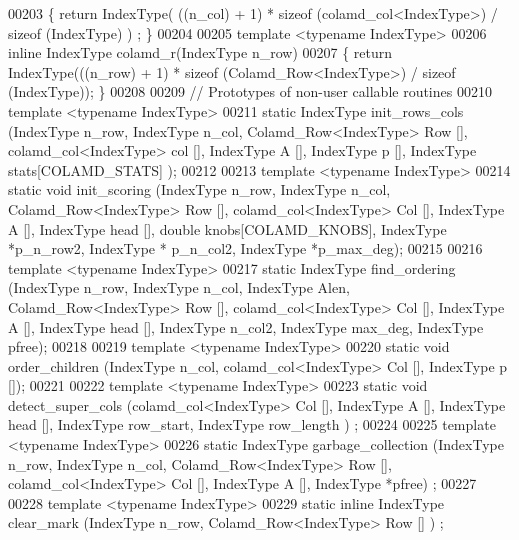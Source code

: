 \begin{DoxyCode}
00203 \{ \textcolor{keywordflow}{return} IndexType( ((n\_col) + 1) * \textcolor{keyword}{sizeof} (colamd\_col<IndexType>) / \textcolor{keyword}{sizeof} (IndexType) ) ; \}
00204 
00205 \textcolor{keyword}{template} <\textcolor{keyword}{typename} IndexType>
00206 \textcolor{keyword}{inline} IndexType  colamd\_r(IndexType n\_row)
00207 \{ \textcolor{keywordflow}{return} IndexType(((n\_row) + 1) * \textcolor{keyword}{sizeof} (Colamd\_Row<IndexType>) / \textcolor{keyword}{sizeof} (IndexType)); \}
00208 
00209 \textcolor{comment}{// Prototypes of non-user callable routines}
00210 \textcolor{keyword}{template} <\textcolor{keyword}{typename} IndexType>
00211 \textcolor{keyword}{static} IndexType init\_rows\_cols (IndexType n\_row, IndexType n\_col, Colamd\_Row<IndexType> Row [], 
      colamd\_col<IndexType> col [], IndexType A [], IndexType p [], IndexType stats[COLAMD\_STATS] ); 
00212 
00213 \textcolor{keyword}{template} <\textcolor{keyword}{typename} IndexType>
00214 \textcolor{keyword}{static} \textcolor{keywordtype}{void} init\_scoring (IndexType n\_row, IndexType n\_col, Colamd\_Row<IndexType> Row [], 
      colamd\_col<IndexType> Col [], IndexType A [], IndexType head [], \textcolor{keywordtype}{double} knobs[COLAMD\_KNOBS], IndexType *p\_n\_row2, IndexType *
      p\_n\_col2, IndexType *p\_max\_deg);
00215 
00216 \textcolor{keyword}{template} <\textcolor{keyword}{typename} IndexType>
00217 \textcolor{keyword}{static} IndexType find\_ordering (IndexType n\_row, IndexType n\_col, IndexType Alen, Colamd\_Row<IndexType> Row
       [], colamd\_col<IndexType> Col [], IndexType A [], IndexType head [], IndexType n\_col2, IndexType max\_deg, 
      IndexType pfree);
00218 
00219 \textcolor{keyword}{template} <\textcolor{keyword}{typename} IndexType>
00220 \textcolor{keyword}{static} \textcolor{keywordtype}{void} order\_children (IndexType n\_col, colamd\_col<IndexType> Col [], IndexType p []);
00221 
00222 \textcolor{keyword}{template} <\textcolor{keyword}{typename} IndexType>
00223 \textcolor{keyword}{static} \textcolor{keywordtype}{void} detect\_super\_cols (colamd\_col<IndexType> Col [], IndexType A [], IndexType head [], IndexType 
      row\_start, IndexType row\_length ) ;
00224 
00225 \textcolor{keyword}{template} <\textcolor{keyword}{typename} IndexType>
00226 \textcolor{keyword}{static} IndexType garbage\_collection (IndexType n\_row, IndexType n\_col, Colamd\_Row<IndexType> Row [], 
      colamd\_col<IndexType> Col [], IndexType A [], IndexType *pfree) ;
00227 
00228 \textcolor{keyword}{template} <\textcolor{keyword}{typename} IndexType>
00229 \textcolor{keyword}{static} \textcolor{keyword}{inline}  IndexType clear\_mark (IndexType n\_row, Colamd\_Row<IndexType> Row [] ) ;

\end{DoxyCode}
